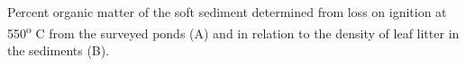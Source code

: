 \label{LOI_survey}
Percent organic matter of the soft sediment determined from loss on ignition at 550\textsuperscript{o} C from the surveyed ponds (A) and in relation to the density of leaf litter in the sediments (B).